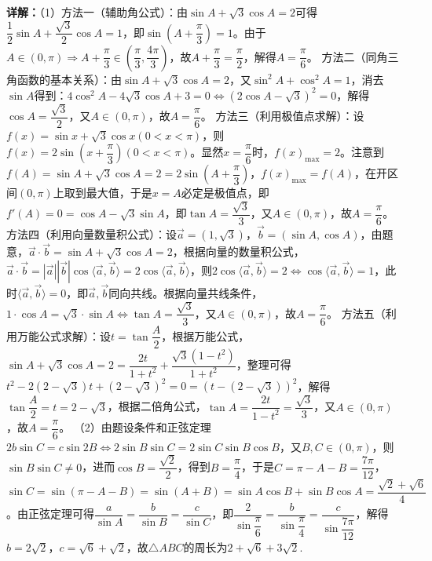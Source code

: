 \begin{question}[points=15]
\begin{solution}
\textbf{详解：}（1）方法一（辅助角公式）：由$\sin A+\sqrt{3}\cos A=2$可得$\dfrac{1}{2}\sin A+\dfrac{\sqrt{3}}{2}\cos A=1$，即$\sin\left(A+\dfrac{\pi}{3}\right)=1$。由于$A\in(0,\pi)\Rightarrow A+\dfrac{\pi}{3}\in\left(\dfrac{\pi}{3},\dfrac{4\pi}{3}\right)$，故$A+\dfrac{\pi}{3}=\dfrac{\pi}{2}$，解得$A=\dfrac{\pi}{6}$。
方法二（同角三角函数的基本关系）：由$\sin A+\sqrt{3}\cos A=2$，又$\sin^2 A+\cos^2 A=1$，消去$\sin A$得到：$4\cos^2 A-4\sqrt{3}\cos A+3=0\Leftrightarrow(2\cos A-\sqrt{3})^2=0$，解得$\cos A=\dfrac{\sqrt{3}}{2}$，又$A\in(0,\pi)$，故$A=\dfrac{\pi}{6}$。
方法三（利用极值点求解）：设$f(x)=\sin x+\sqrt{3}\cos x(0<x<\pi)$，则$f(x)=2\sin\left(x+\dfrac{\pi}{3}\right)(0<x<\pi)$。显然$x=\dfrac{\pi}{6}$时，$f(x)_{\max}=2$。注意到$f(A)=\sin A+\sqrt{3}\cos A=2=2\sin\left(A+\dfrac{\pi}{3}\right)$，$f(x)_{\max}=f(A)$，在开区间$(0,\pi)$上取到最大值，于是$x=A$必定是极值点，即$f'(A)=0=\cos A-\sqrt{3}\sin A$，即$\tan A=\dfrac{\sqrt{3}}{3}$，又$A\in(0,\pi)$，故$A=\dfrac{\pi}{6}$。
方法四（利用向量数量积公式）：设$\vec{a}=(1,\sqrt{3})$，$\vec{b}=(\sin A,\cos A)$，由题意，$\vec{a}\cdot\vec{b}=\sin A+\sqrt{3}\cos A=2$，根据向量的数量积公式，$\vec{a}\cdot\vec{b}=|\vec{a}||\vec{b}|\cos\langle\vec{a},\vec{b}\rangle=2\cos\langle\vec{a},\vec{b}\rangle$，则$2\cos\langle\vec{a},\vec{b}\rangle=2\Leftrightarrow\cos\langle\vec{a},\vec{b}\rangle=1$，此时$\langle\vec{a},\vec{b}\rangle=0$，即$\vec{a},\vec{b}$同向共线。根据向量共线条件，$1\cdot\cos A=\sqrt{3}\cdot\sin A\Leftrightarrow\tan A=\dfrac{\sqrt{3}}{3}$，又$A\in(0,\pi)$，故$A=\dfrac{\pi}{6}$。
方法五（利用万能公式求解）：设$t=\tan\dfrac{A}{2}$，根据万能公式，$\sin A+\sqrt{3}\cos A=2=\dfrac{2t}{1+t^2}+\dfrac{\sqrt{3}(1-t^2)}{1+t^2}$，整理可得$t^2-2(2-\sqrt{3})t+(2-\sqrt{3})^2=0=(t-(2-\sqrt{3}))^2$，解得$\tan\dfrac{A}{2}=t=2-\sqrt{3}$，根据二倍角公式，$\tan A=\dfrac{2t}{1-t^2}=\dfrac{\sqrt{3}}{3}$，又$A\in(0,\pi)$，故$A=\dfrac{\pi}{6}$。
（2）由题设条件和正弦定理$2b\sin C=c\sin2B\Leftrightarrow2\sin B\sin C=2\sin C\sin B\cos B$，又$B,C\in(0,\pi)$，则$\sin B\sin C\neq0$，进而$\cos B=\dfrac{\sqrt{2}}{2}$，得到$B=\dfrac{\pi}{4}$，于是$C=\pi-A-B=\dfrac{7\pi}{12}$，$\sin C=\sin(\pi-A-B)=\sin(A+B)=\sin A\cos B+\sin B\cos A=\dfrac{\sqrt{2}+\sqrt{6}}{4}$。由正弦定理可得$\dfrac{a}{\sin A}=\dfrac{b}{\sin B}=\dfrac{c}{\sin C}$，即$\dfrac{2}{\sin\dfrac{\pi}{6}}=\dfrac{b}{\sin\dfrac{\pi}{4}}=\dfrac{c}{\sin\dfrac{7\pi}{12}}$，解得$b=2\sqrt{2}$，$c=\sqrt{6}+\sqrt{2}$，故$\triangle ABC$的周长为$2+\sqrt{6}+3\sqrt{2}$.
\end{solution}
\end{question}

